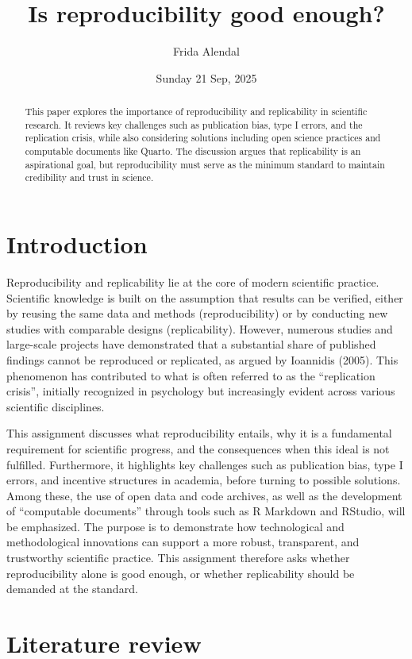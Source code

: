 \documentclass[
  a4paper,
]{article}
\title{Is reproducibility good enough?}
\author{Frida Alendal}
\date{Sunday 21 Sep, 2025}
\begin{document}
\maketitle
\begin{abstract}
This paper explores the importance of reproducibility and replicability
in scientific research. It reviews key challenges such as publication
bias, type I errors, and the replication crisis, while also considering
solutions including open science practices and computable documents like
Quarto. The discussion argues that replicability is an aspirational
goal, but reproducibility must serve as the minimum standard to maintain
credibility and trust in science.
\end{abstract}


\section{Introduction}\label{introduction}

Reproducibility and replicability lie at the core of modern scientific
practice. Scientific knowledge is built on the assumption that results
can be verified, either by reusing the same data and methods
(reproducibility) or by conducting new studies with comparable designs
(replicability). However, numerous studies and large-scale projects have
demonstrated that a substantial share of published findings cannot be
reproduced or replicated, as argued by Ioannidis (2005). This phenomenon
has contributed to what is often referred to as the ``replication
crisis'', initially recognized in psychology but increasingly evident
across various scientific disciplines.

This assignment discusses what reproducibility entails, why it is a
fundamental requirement for scientific progress, and the consequences
when this ideal is not fulfilled. Furthermore, it highlights key
challenges such as publication bias, type I errors, and incentive
structures in academia, before turning to possible solutions. Among
these, the use of open data and code archives, as well as the
development of ``computable documents'' through tools such as R Markdown
and RStudio, will be emphasized. The purpose is to demonstrate how
technological and methodological innovations can support a more robust,
transparent, and trustworthy scientific practice. This assignment
therefore asks whether reproducibility alone is good enough, or whether
replicability should be demanded at the standard.

\section{Literature review}\label{literature-review}
\end{document}
